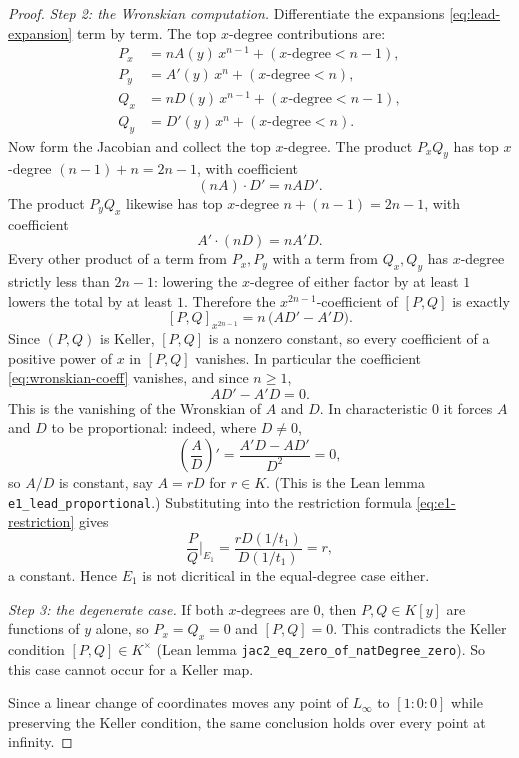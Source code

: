 \documentclass[a4paper,11pt]{article}
\theoremstyle{plain}
\theoremstyle{definition}
\theoremstyle{remark}
\begin{document}
\begin{proof}
\emph{Step 2: the Wronskian computation.} Differentiate the expansions
\eqref{eq:lead-expansion} term by term. The top $x$-degree contributions are:
\begin{align}
P_x &= n A(y)\, x^{n-1} + (\text{$x$-degree} < n-1), \\
P_y &= A'(y)\, x^{n} + (\text{$x$-degree} < n), \\
Q_x &= n D(y)\, x^{n-1} + (\text{$x$-degree} < n-1), \\
Q_y &= D'(y)\, x^{n} + (\text{$x$-degree} < n).
\end{align}
Now form the Jacobian and collect the top $x$-degree. The product $P_x Q_y$ has top
$x$-degree $(n-1) + n = 2n - 1$, with coefficient
\[
(n A) \cdot D' = n A D'.
\]
The product $P_y Q_x$ likewise has top $x$-degree $n + (n-1) = 2n - 1$, with coefficient
\[
A' \cdot (n D) = n A' D.
\]
Every other product of a term from $P_x, P_y$ with a term from $Q_x, Q_y$ has $x$-degree
strictly less than $2n - 1$: lowering the $x$-degree of either factor by at least $1$ lowers
the total by at least $1$. Therefore the $x^{2n-1}$-coefficient of $[P,Q]$ is exactly
\begin{equation}\label{eq:wronskian-coeff}
[P,Q]_{x^{2n-1}} = n\,\big(A D' - A' D\big).
\end{equation}
Since $(P,Q)$ is Keller, $[P,Q]$ is a nonzero constant, so every coefficient of a positive
power of $x$ in $[P,Q]$ vanishes. In particular the coefficient \eqref{eq:wronskian-coeff}
vanishes, and since $n \geq 1$,
\[
A D' - A' D = 0.
\]
This is the vanishing of the Wronskian of $A$ and $D$. In characteristic $0$ it forces $A$
and $D$ to be proportional: indeed, where $D \neq 0$,
\[
\left(\frac{A}{D}\right)' = \frac{A' D - A D'}{D^2} = 0,
\]
so $A/D$ is constant, say $A = r D$ for $r \in K$. (This is the Lean lemma
\texttt{e1\_lead\_proportional}.) Substituting into the restriction formula
\eqref{eq:e1-restriction} gives
\[
\frac{P}{Q}\bigg|_{E_1} = \frac{r D(1/t_1)}{D(1/t_1)} = r,
\]
a constant. Hence $E_1$ is not dicritical in the equal-degree case either.

\emph{Step 3: the degenerate case.} If both $x$-degrees are $0$, then $P, Q \in K[y]$ are
functions of $y$ alone, so $P_x = Q_x = 0$ and $[P,Q] = 0$. This contradicts the Keller
condition $[P,Q] \in K^\times$ (Lean lemma \texttt{jac2\_eq\_zero\_of\_natDegree\_zero}). So
this case cannot occur for a Keller map.

Since a linear change of coordinates moves any point of $L_\infty$ to $[1:0:0]$ while
preserving the Keller condition, the same conclusion holds over every point at infinity.
\end{proof}
\end{document}
